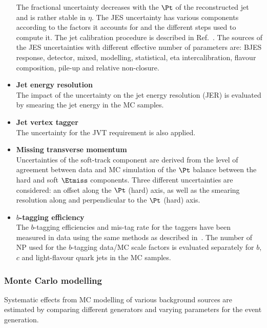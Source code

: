 \begin{itemize}
	The fractional uncertainty decreases with the $\Pt$ of the
	reconstructed jet and is rather stable in $\eta$. The JES uncertainty
	has various components according to the factors it accounts for and
	the different steps used to compute it. The jet calibration procedure
	is described in Ref.~\cite{PERF-2016-04}.
	The sources of the JES uncertainties with different effective number
	of parameters are: BJES response, detector, mixed, modelling,
	statistical, eta intercalibration, flavour composition, pile-up and
	relative non-closure. 
	\item \textbf{Jet energy resolution} \\ 
	The impact of the uncertainty on the jet energy resolution (JER) is
	evaluated by smearing the jet energy in the MC samples. 
	\item \textbf{Jet vertex tagger} \\ 
	The uncertainty for the JVT requirement is also applied. 	
	\item \textbf{Missing transverse momentum} \\ 
	Uncertainties of the soft-track component are derived from the level
	of agreement between data and MC simulation of the $\Pt$ balance
	between the hard and soft $\Etmiss$ components. Three different
	uncertainties are considered: an offset along the $\Pt$ (hard) axis,
	as well as the smearing resolution along and perpendicular to the
	$\Pt$ (hard) axis.
	\item \textbf{$b$-tagging efficiency} \\ 
	The $b$-tagging efficiencies and mis-tag rate for the taggers have
	been measured in data using the same methods as described
	in~\cite{ATLAS-CONF-2014-046,ATLAS-CONF-2014-004}. The number of NP
	used for the $b$-tagging data/MC scale factors is evaluated
	separately for $b$, $c$ and light-flavour quark jets in the MC
	samples.	
\end{itemize}

\subsubsection{Monte Carlo modelling} 
Systematic effects from MC modelling of various background sources are estimated by comparing
different generators and varying parameters for the event generation.

